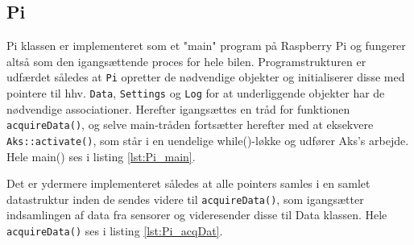 \subsection{Pi} \label{sec:pi_impl}

Pi klassen er implementeret som et "main" program på Raspberry Pi og fungerer altså som den igangsættende proces for hele bilen.
Programstrukturen er udfærdet således at \texttt{Pi} opretter de nødvendige objekter og initialiserer disse med pointere til hhv. \texttt{Data}, \texttt{Settings} og \texttt{Log} for at underliggende objekter har de nødvendige associationer. Herefter igangsættes en tråd for funktionen \texttt{acquireData()}, og selve main-tråden fortsætter herefter med at eksekvere \texttt{Aks::activate()}, som står i en uendelige while()-løkke og udfører Aks's arbejde.
Hele main() ses i listing \ref{lst:Pi_main}.



Det er ydermere implementeret således at alle pointers samles i en samlet datastruktur inden de sendes videre til \texttt{acquireData()}, som igangsætter indsamlingen af data fra sensorer og videresender disse til Data klassen.
Hele \texttt{acquireData()} ses i listing \ref{lst:Pi_acqDat}.

